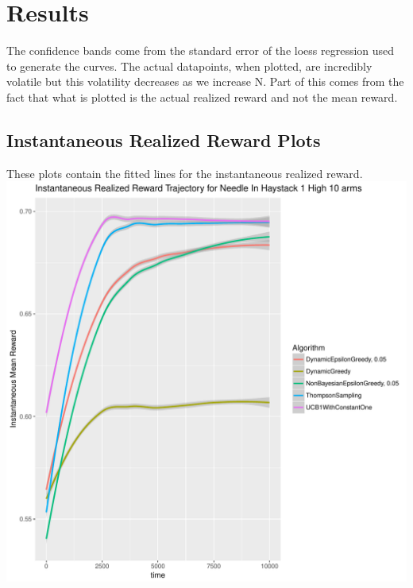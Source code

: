 \documentclass[11pt,letterpaper]{article}
\begin{document}
\section*{Results}

The confidence bands come from the standard error of the loess regression used to generate the curves. The actual datapoints, when plotted, are incredibly volatile but this volatility decreases as we increase N. Part of this comes from the fact that what is plotted is the actual realized reward and not the mean reward. \\
\subsection*{Instantaneous Realized Reward Plots}
These plots contain the fitted lines for the instantaneous realized reward. \\
\includegraphics[scale=0.5]{"../results/preliminary_figures/Instantaneous Realized Reward Trajectory for Needle In Haystack 1 High 10 arms"} \\
\end{document}

